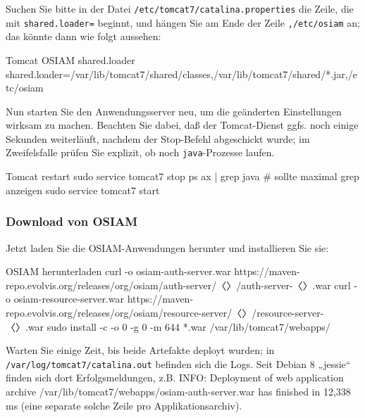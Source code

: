 \begin{minipage}{\textwidth}
Suchen Sie bitte in der Datei \texttt{/etc/tomcat7/catalina.properties}
die Zeile, die mit \texttt{shared.loader=} beginnt, und hängen Sie am
Ende der Zeile \texttt{,/etc/osiam} an; das könnte dann wie folgt aussehen:

\begin{lstdump}{Tomcat OSIAM shared.loader}
shared.loader=/var/lib/tomcat7/shared/classes,/var/lib/tomcat7/shared/*.jar,/etc/osiam
\end{lstdump}
\end{minipage}

Nun starten Sie den Anwendungsserver neu, um die geänderten
Einstellungen wirksam zu machen. Beachten Sie dabei, daß der
Tomcat-Dienst ggfs. noch einige Sekunden weiterläuft, nachdem
der Stop-Befehl abgeschickt wurde; im Zweifelsfalle prüfen Sie
explizit, ob noch \texttt{java}-Prozesse laufen.\keinumbruch

\begin{minipage}{\textwidth}
\begin{lstdump}{Tomcat restart}
sudo service tomcat7 stop
ps ax | grep java # sollte maximal grep anzeigen
sudo service tomcat7 start
\end{lstdump}
\end{minipage}

\subsubsection{Download von OSIAM}\label{subsubsec:setup-osiam-download}

\begin{minipage}{\textwidth}
Jetzt laden Sie die OSIAM-Anwendungen herunter und installieren Sie sie:

\begin{lstdump}{OSIAM herunterladen}
curl -o osiam-auth-server.war https://maven-repo.evolvis.org/releases/org/osiam/auth-server/〈\lstdumpesc{\vwiaversosiam}〉/auth-server-〈\lstdumpesc{\vwiaversosiam}〉.war
curl -o osiam-resource-server.war https://maven-repo.evolvis.org/releases/org/osiam/resource-server/〈\lstdumpesc{\vwiaversosiam}〉/resource-server-〈\lstdumpesc{\vwiaversosiam}〉.war
sudo install -c -o 0 -g 0 -m 644 *.war /var/lib/tomcat7/webapps/
\end{lstdump}
\end{minipage}

Warten Sie einige Zeit, bis beide Artefakte deployt wurden; in
\texttt{/var/log/tomcat7/catalina.out} befinden sich die Logs.
Seit Debian 8 „jessie“ finden sich dort Erfolgsmeldungen, z.B.
{\ttfamily INFO: Deployment of web application archive
/var/lib/tomcat7/webapps/osiam-auth-server.war has finished
in 12,338 ms} (eine separate solche Zeile pro Applikationsarchiv).

